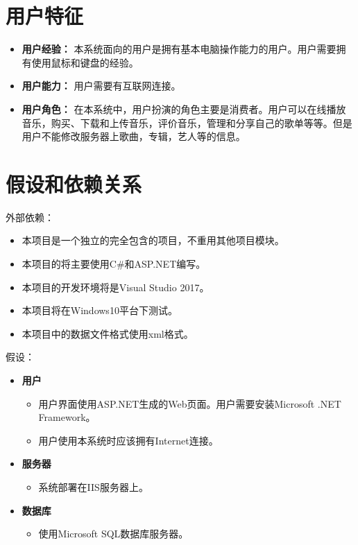 \section{用户特征}

\begin{itemize}
	\item \textbf{用户经验：}	本系统面向的用户是拥有基本电脑操作能力的用户。用户需要拥有使用鼠标和键盘的经验。
	\item \textbf{用户能力：} 用户需要有互联网连接。
	\item \textbf{用户角色：}	在本系统中，用户扮演的角色主要是消费者。用户可以在线播放音乐，购买、下载和上传音乐，评价音乐，管理和分享自己的歌单等等。但是用户不能修改服务器上歌曲，专辑，艺人等的信息。
\end{itemize}
\section{假设和依赖关系}


外部依赖：

\begin{itemize}
	\item \textbf{}本项目是一个独立的完全包含的项目，不重用其他项目模块。
	\item \textbf{}本项目的将主要使用C\#和ASP.NET编写。
	\item \textbf{}本项目的开发环境将是Visual Studio 2017。
	\item \textbf{}本项目将在Windows10平台下测试。
	\item \textbf{}本项目中的数据文件格式使用xml格式。
\end{itemize}
假设：

\begin{itemize}
	\item \textbf{用户}
	\begin{itemize}
		\item \textbf{}用户界面使用ASP.NET生成的Web页面。用户需要安装Microsoft .NET Framework。
		\item \textbf{}用户使用本系统时应该拥有Internet连接。
	\end{itemize}
	\item \textbf{服务器}
	\begin{itemize}
		\item \textbf{}系统部署在IIS服务器上。
	\end{itemize}
	\item \textbf{数据库}
	\begin{itemize}
		\item \textbf{}使用Microsoft SQL数据库服务器。
	\end{itemize}
\end{itemize}	